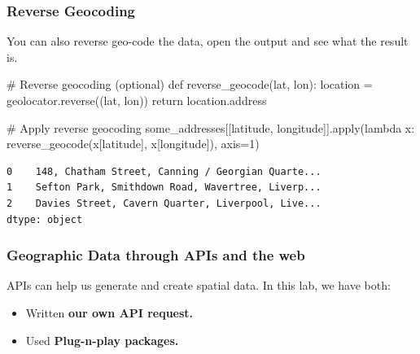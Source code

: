 \documentclass[
  letterpaper,
  DIV=11,
  numbers=noendperiod]{scrreprt}
\newenvironment{Shaded}{\begin{snugshade}}{\end{snugshade}}
\newcommand{\BuiltInTok}[1]{\textcolor[rgb]{0.00,0.23,0.31}{#1}}
\newcommand{\CommentTok}[1]{\textcolor[rgb]{0.37,0.37,0.37}{#1}}
\newcommand{\ControlFlowTok}[1]{\textcolor[rgb]{0.00,0.23,0.31}{#1}}
\newcommand{\DecValTok}[1]{\textcolor[rgb]{0.68,0.00,0.00}{#1}}
\newcommand{\KeywordTok}[1]{\textcolor[rgb]{0.00,0.23,0.31}{#1}}
\newcommand{\NormalTok}[1]{\textcolor[rgb]{0.00,0.23,0.31}{#1}}
\newcommand{\OperatorTok}[1]{\textcolor[rgb]{0.37,0.37,0.37}{#1}}
\newcommand{\StringTok}[1]{\textcolor[rgb]{0.13,0.47,0.30}{#1}}
\providecommand{\tightlist}{%
  \setlength{\itemsep}{0pt}\setlength{\parskip}{0pt}}\usepackage{longtable,booktabs,array}
\begin{document}
\hypertarget{reverse-geocoding}{%
\subsubsection{Reverse Geocoding}\label{reverse-geocoding}}

You can also reverse geo-code the data, open the output and see what the
result is.

\begin{Shaded}
\begin{Highlighting}[]
\CommentTok{\# Reverse geocoding (optional)}
\KeywordTok{def}\NormalTok{ reverse\_geocode(lat, lon):}
\NormalTok{    location }\OperatorTok{=}\NormalTok{ geolocator.reverse((lat, lon))}
    \ControlFlowTok{return}\NormalTok{ location.address}

\CommentTok{\# Apply reverse geocoding}
\NormalTok{some\_addresses[[}\StringTok{\textquotesingle{}latitude\textquotesingle{}}\NormalTok{, }\StringTok{\textquotesingle{}longitude\textquotesingle{}}\NormalTok{]].}\BuiltInTok{apply}\NormalTok{(}\KeywordTok{lambda}\NormalTok{ x: reverse\_geocode(x[}\StringTok{\textquotesingle{}latitude\textquotesingle{}}\NormalTok{], x[}\StringTok{\textquotesingle{}longitude\textquotesingle{}}\NormalTok{]), axis}\OperatorTok{=}\DecValTok{1}\NormalTok{)}
\end{Highlighting}
\end{Shaded}

\begin{verbatim}
0    148, Chatham Street, Canning / Georgian Quarte...
1    Sefton Park, Smithdown Road, Wavertree, Liverp...
2    Davies Street, Cavern Quarter, Liverpool, Live...
dtype: object
\end{verbatim}

\hypertarget{geographic-data-through-apis-and-the-web}{%
\subsubsection{Geographic Data through APIs and the
web}\label{geographic-data-through-apis-and-the-web}}

APIs can help us generate and create spatial data. In this lab, we have
both:

\begin{itemize}
\tightlist
\item
  Written \textbf{our own API request.}
\item
  Used \textbf{Plug-n-play packages.}
\end{itemize}
\end{document}
